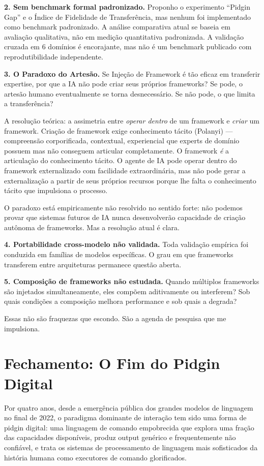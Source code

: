 \documentclass[12pt,a4paper]{article}
\begin{document}
\textbf{2. Sem benchmark formal padronizado.} Proponho o experimento ``Pidgin Gap'' e o Índice de Fidelidade de Transferência, mas nenhum foi implementado como benchmark padronizado. A análise comparativa atual se baseia em avaliação qualitativa, não em medição quantitativa padronizada. A validação cruzada em 6 domínios é encorajante, mas não é um benchmark publicado com reprodutibilidade independente.

\textbf{3. O Paradoxo do Artesão.} Se Injeção de Framework é tão eficaz em transferir expertise, por que a IA não pode criar seus próprios frameworks? Se pode, o artesão humano eventualmente se torna desnecessário. Se não pode, o que limita a transferência?

A resolução teórica: a assimetria entre \emph{operar dentro} de um framework e \emph{criar} um framework. Criação de framework exige conhecimento tácito (Polanyi) --- compreensão corporificada, contextual, experiencial que experts de domínio possuem mas não conseguem articular completamente. O framework \emph{é} a articulação do conhecimento tácito. O agente de IA pode operar dentro do framework externalizado com facilidade extraordinária, mas não pode gerar a externalização a partir de seus próprios recursos porque lhe falta o conhecimento tácito que impulsiona o processo.

O paradoxo está empiricamente não resolvido no sentido forte: não podemos provar que sistemas futuros de IA nunca desenvolverão capacidade de criação autônoma de frameworks. Mas a resolução atual é clara.

\textbf{4. Portabilidade cross-modelo não validada.} Toda validação empírica foi conduzida em famílias de modelos específicas. O grau em que frameworks transferem entre arquiteturas permanece questão aberta.

\textbf{5. Composição de frameworks não estudada.} Quando múltiplos frameworks são injetados simultaneamente, eles compõem aditivamente ou interferem? Sob quais condições a composição melhora performance e sob quais a degrada?

Essas não são fraquezas que escondo. São a agenda de pesquisa que me impulsiona.

\section{Fechamento: O Fim do Pidgin Digital}
\label{sec:fechamento}

Por quatro anos, desde a emergência pública dos grandes modelos de linguagem no final de 2022, o paradigma dominante de interação tem sido uma forma de pidgin digital: uma linguagem de comando empobrecida que explora uma fração das capacidades disponíveis, produz output genérico e frequentemente não confiável, e trata os sistemas de processamento de linguagem mais sofisticados da história humana como executores de comando glorificados.
\end{document}

